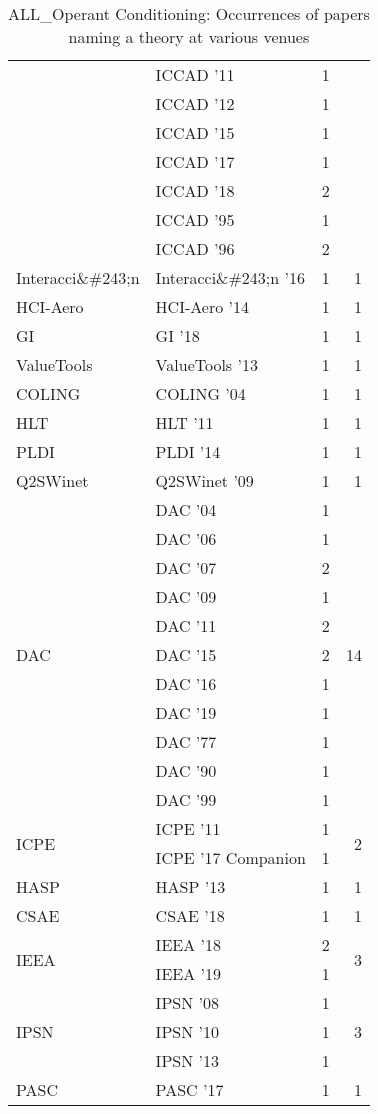 \begin{table*}[t]
\begin{tabular}{llrr}
& ICCAD '11 & 1 &\\
& ICCAD '12 & 1 &\\
& ICCAD '15 & 1 &\\
& ICCAD '17 & 1 &\\
& ICCAD '18 & 2 &\\
& ICCAD '95 & 1 &\\
& ICCAD '96 & 2 &\\
\multirow{1}{*}{Interacci\&\#243;n } & Interacci\&\#243;n '16 & 1 & \multirow{1}{*}{1}\\
\multirow{1}{*}{HCI-Aero } & HCI-Aero '14 & 1 & \multirow{1}{*}{1}\\
\multirow{1}{*}{GI } & GI '18 & 1 & \multirow{1}{*}{1}\\
\multirow{1}{*}{ValueTools } & ValueTools '13 & 1 & \multirow{1}{*}{1}\\
\multirow{1}{*}{COLING } & COLING '04 & 1 & \multirow{1}{*}{1}\\
\multirow{1}{*}{HLT } & HLT '11 & 1 & \multirow{1}{*}{1}\\
\multirow{1}{*}{PLDI } & PLDI '14 & 1 & \multirow{1}{*}{1}\\
\multirow{1}{*}{Q2SWinet } & Q2SWinet '09 & 1 & \multirow{1}{*}{1}\\
\multirow{11}{*}{DAC } & DAC '04 & 1 & \multirow{11}{*}{14}\\
& DAC '06 & 1 &\\
& DAC '07 & 2 &\\
& DAC '09 & 1 &\\
& DAC '11 & 2 &\\
& DAC '15 & 2 &\\
& DAC '16 & 1 &\\
& DAC '19 & 1 &\\
& DAC '77 & 1 &\\
& DAC '90 & 1 &\\
& DAC '99 & 1 &\\
\multirow{2}{*}{ICPE } & ICPE '11 & 1 & \multirow{2}{*}{2}\\
& ICPE '17 Companion & 1 &\\
\multirow{1}{*}{HASP } & HASP '13 & 1 & \multirow{1}{*}{1}\\
\multirow{1}{*}{CSAE } & CSAE '18 & 1 & \multirow{1}{*}{1}\\
\multirow{2}{*}{IEEA } & IEEA '18 & 2 & \multirow{2}{*}{3}\\
& IEEA '19 & 1 &\\
\multirow{3}{*}{IPSN } & IPSN '08 & 1 & \multirow{3}{*}{3}\\
& IPSN '10 & 1 &\\
& IPSN '13 & 1 &\\
\multirow{1}{*}{PASC } & PASC '17 & 1 & \multirow{1}{*}{1}\\
\end{tabular}
\caption{ALL\_Operant Conditioning: Occurrences of papers naming a theory at various venues}
\end{table*}